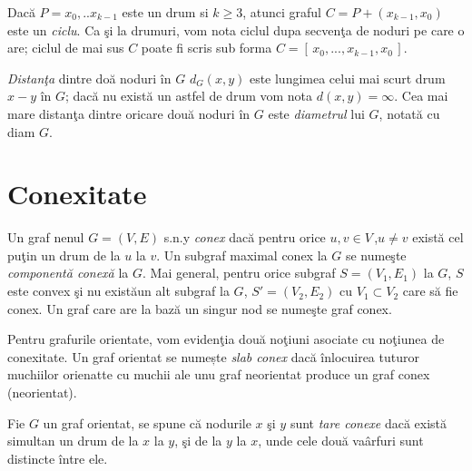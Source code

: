 \documentclass[11pt,a4paper]{report}
\newtheorem{prop}{Propozi\c tie}
\newenvironment{demo}{\paragraph{\textbf{Demonstra\c{t}ie}:}}{\hfill$\square$}
\begin{document}
    Dac\u a $P=x_0,..x_{k-1}$ este un drum si $k\ge 3$, atunci graful $C=P+(x_{k-1},x_0)$ este un \textit{ciclu}. Ca \c si la drumuri, vom nota ciclul dupa secven\c ta de noduri pe care o are; ciclul de mai sus $C$ poate fi scris  sub forma $C=[\,x_0,...,x_{k-1},x_0\,]$.
    
    \textit{Distan\c ta} dintre do\u a noduri \^ in $G$ $d_G(x,y)$ este lungimea celui mai scurt drum $x-y$ \^ in $G$; dac\u a nu exist\u a un astfel de drum vom nota $d(x,y)=\infty$. Cea mai mare distan\c ta dintre oricare dou\u a noduri \^ in $G$ este \textit{diametrul} lui $G$, notat\u a cu diam $G$.
    
    \section{Conexitate}
    
    Un graf nenul $G=(V,E)$ s.n.y \textit{conex} dac\u a pentru orice $u,v\in V \,$,$u\neq v$ exist\u a cel pu\c tin un drum de la $u$ la $v$. Un subgraf maximal conex la $G$  se nume\c ste \textit{component\u a conex\u a} la $G$. Mai general, pentru orice subgraf $S=(V_1,E_1)$ la $G$, $S$ este convex \c si nu exist\u aun alt subgraf la $G$, $S'=(V_2,E_2)$ cu $V_1\subset V_2$ care s\u a fie conex. Un graf care are la baz\u a un singur nod se nume\c ste graf conex.
    
    Pentru grafurile orientate, vom eviden\c tia dou\u a no\c tiuni asociate cu no\c tiunea de conexitate. 
    Un graf orientat se numește \textit{slab conex} dacă înlocuirea tuturor muchiilor orienatte cu muchii ale unu graf neorientat produce un graf conex (neorientat).
    
    Fie $G$ un graf orientat, se spune c\u a nodurile $x$ \c si $y$ sunt \textit{tare conexe} dac\u a exist\u a simultan un drum de la $x$ la $y$, \c si de la $y$ la $x$, unde cele dou\u a va\^ arfuri sunt distincte \^ intre ele.
   
\end{document}
